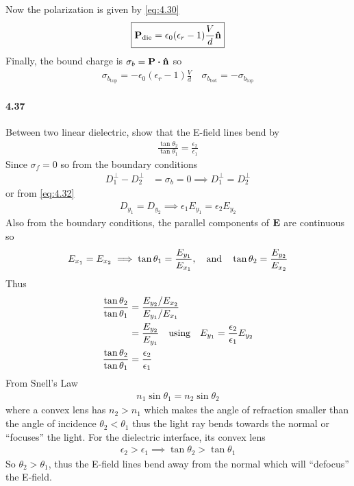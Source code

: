 \documentclass[../main.tex]{subfiles}
\begin{document}
\begin{itemize}
\begin{itemize}
        Now the polarization is given by \eqref{eq:4.30}
        \begin{align*}
            \boxed{
                \vb P_\text{die} = \epsilon_0 (\epsilon_r - 1) \frac{V}{d} \vu n
            }
        \end{align*}
        Finally, the bound charge is $\sigma_b = \vb P \vdot \vu n$ so
        \begin{align*}
            \boxed{
                \sigma_{b_\text{top}} = -\epsilon_0 (\epsilon_r - 1) \frac{V}{d} \quad \sigma_{b_\text{bot}} = -\sigma_{b_\text{top}}
            }
        \end{align*}
    \end{itemize}
\end{itemize}

\newpage
\paragraph{4.37} Between two linear dielectric, show that the E-field lines bend by
\begin{align*} \tag{4.68} \label{eq:4.68}
    \frac{\tan\theta_2}{\tan\theta_1} = \frac{\epsilon_2}{\epsilon_1}
\end{align*}
Since $\sigma_f = 0$ so from the boundary conditions 
\begin{align*}
    D^\perp_1 - D^\perp_2 &= \sigma_b = 0 \implies D^\perp_1 = D^\perp_2
\end{align*}
or from \eqref{eq:4.32}
\begin{align*}
    D_{y_1} = D_{y_2} \implies \epsilon_1 E_{y_1} = \epsilon_2 E_{y_2}
\end{align*}
Also from the boundary conditions, the parallel components of $\vb E$ are continuous so
\begin{align*}
    E_{x_1} = E_{x_2} \implies \tan\theta_1 = \frac{E_{y_1}}{E_{x_1}},\qand \tan\theta_2 = \frac{E_{y_2}}{E_{x_2}}
\end{align*}
Thus
\begin{align*}
    \frac{\tan\theta_2}{\tan\theta_1} &= \frac{E_{y_2}/E_{x_2}}{E_{y_1}/E_{x_1}} \\
    &= \frac{E_{y_2}}{E_{y_1}} \qusing E_{y_1} = \frac{\epsilon_2}{\epsilon_1} E_{y_2} \\
    \frac{\tan\theta_2}{\tan\theta_1} &= \frac{\epsilon_2}{\epsilon_1}
\end{align*}
From Snell's Law
\begin{align*}
    n_1 \sin\theta_1 = n_2 \sin\theta_2
\end{align*}
where a convex lens has $n_2 > n_1$ which makes the angle of refraction smaller than the angle of incidence $\theta_2 < \theta_1$ thus the light ray bends towards the normal or ``focuses'' the light.
For the dielectric interface, its convex lens
\begin{align*}
    \epsilon_2 > \epsilon_1 \implies \tan\theta_2 > \tan\theta_1
\end{align*}
So $\theta_2 > \theta_1$, thus the E-field lines bend away from the normal which will ``defocus'' the E-field.
\end{document}

